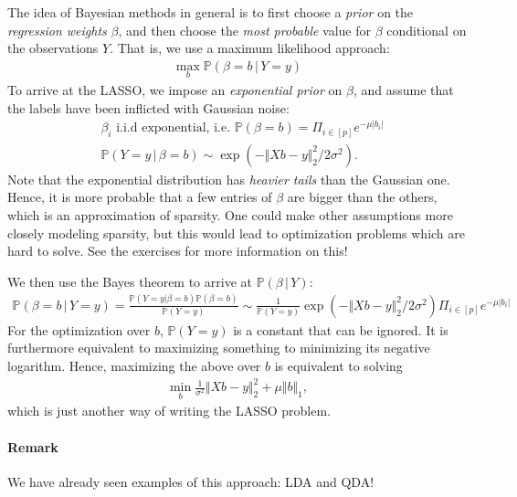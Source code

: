 \documentclass{article}
\newcommand{\abs}[1]{\vert #1 \vert}
\newcommand{\norm}[1]{\Vert #1 \Vert}
\begin{document}
The idea of Bayesian methods in general is to first choose a \emph{prior} on the \emph{regression weights} $\beta$, and then choose the \emph{most probable} value for $\beta$ conditional on the observations $Y$. That is, we use a maximum likelihood approach:
\begin{align*}
    \max_{b} \mathbb{P}(\beta = b \, \vert \,Y=y)
\end{align*}
To arrive at the LASSO, we impose an \emph{exponential prior} on $\beta$, and assume that the labels have been inflicted with Gaussian noise:
\begin{align}
    &\beta_i \text{ i.i.d exponential, i.e. } \mathbb{P}(\beta = b) = \Pi_{i\in [p]}e^{-\mu\abs{b_i}} \\
    &\mathbb{P}(Y=y\, \vert \, \beta=b) \sim \exp(-\norm{Xb-y}^2_2/2\sigma^2).
\end{align}
Note that the exponential distribution has \emph{heavier tails} than the Gaussian one. Hence, it is more probable that a few entries of $\beta$ are bigger than the others, which is an approximation of sparsity. One could make other assumptions more closely modeling sparsity, but this would lead to optimization problems which are hard to solve. See the exercises for more information on this!

We then use the Bayes theorem to arrive at $\mathbb{P}(\beta \, \vert \, Y)$:
\begin{align*}
     \mathbb{P}(\beta =b\, \vert \, Y=y) = \frac{\mathbb{P}(Y =y\vert \beta=b)\mathbb{P}(\beta=b)}{\mathbb{P}(Y=y)} \sim \frac{1}{\mathbb{P}(Y=y)}  \exp(-\norm{Xb-y}^2_2/2\sigma^2)\Pi_{i\in [p]}e^{-\mu\abs{b_i}}
\end{align*}
For the optimization over $b$, $\mathbb{P}(Y=y)$ is a constant that can be ignored. It is furthermore equivalent to maximizing something to minimizing its negative logarithm. Hence, maximizing the above over $b$ is equivalent to solving
\begin{align*}
    \min_{b}\tfrac{1}{\sigma^2} \norm{Xb-y}_2^2 + \mu\norm{b}_1,
\end{align*}
which is just another way of writing the LASSO problem.

\paragraph{Remark} We have already seen examples of this approach: LDA and QDA!
\end{document}
